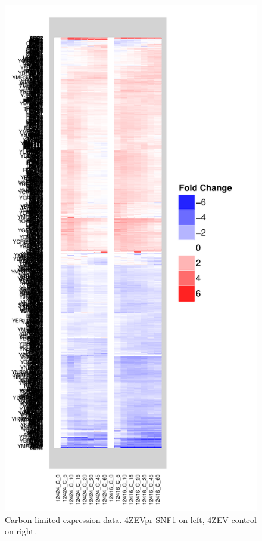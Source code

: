 \documentclass[letter]{article}\usepackage{graphicx, color}
\makeatletter
\def\maxwidth{ %
  \ifdim\Gin@nat@width>\linewidth
    \linewidth
  \else
    \Gin@nat@width
  \fi
}
\newenvironment{knitrout}{}{} %
\makeatother
\begin{document}
\begin{figure}[hbtp]
\centering
\begin{knitrout}
\color{fgcolor}\includegraphics[width=\maxwidth]{figure/p2} 
\end{knitrout}

\caption{Carbon-limited expression data. 4ZEVpr-SNF1 on left, 4ZEV control on right.}
\end{figure}
\end{document}
